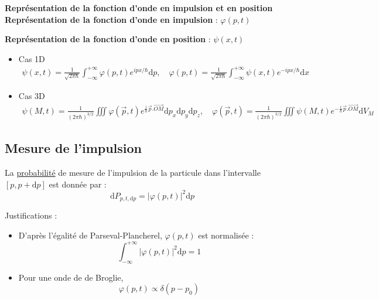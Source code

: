 \begin{Definition}[colbacktitle=red!75!black]{\textbf{Représentation de la fonction d'onde en impulsion et en position}}{}
\textbf{Représentation de la fonction d'onde en impulsion} : $\varphi(p,t)$

\textbf{Représentation de la fonction d'onde en position} : $\psi(x,t)$
\begin{itemize}

    \item Cas 1D
\begin{gather}
  \psi (x, t) = \frac{1}{\sqrt{2 \pi \hbar}}  \int_{ - \infty}^{ + \infty} \varphi(p,t) e ^{ipx / \hbar} \mathrm{d} p, \quad
  \varphi (p, t) = \frac{1}{\sqrt{2 \pi \hbar}}  \int_{ - \infty}^{ + \infty} \psi(x,t) e ^{-ipx / \hbar} \mathrm{d} x
\end{gather}

\item Cas 3D 
  \begin{gather}
    \psi(M,t) = \frac{1}{(2 \pi \hbar) ^{3 / 2}}   \iiint \varphi(\overrightarrow{p},t) e ^{\frac{i}{\hbar} \overrightarrow{p}. \overrightarrow{OM}} \mathrm{d} p_x \mathrm{d} p_y \mathrm{d} p_z, \quad 
    \varphi(\overrightarrow{p},t) = \frac{1}{(2 \pi \hbar) ^{3 / 2}}   \iiint \psi(M,t) e ^{-\frac{i}{\hbar} \overrightarrow{p}. \overrightarrow{OM}} \mathrm{d} V_M
  \end{gather} 

\end{itemize}
\end{Definition}

\subsection{Mesure de l'impulsion} %
\label{sub:Mesure de l'impulsion}

La \underline{probabilité} de mesure de l'impulsion de la particule dans l'intervalle $[p, p + \mathrm{d}p]$ est donnée par : 
\begin{equation}
  \mathrm{d}P _{p, t, \mathrm{d}p} = |\varphi(p, t)| ^{2} \mathrm{d}p
\end{equation}

Justifications : 
\begin{itemize}

    \item D'après l'égalité de Parseval-Plancherel, $\varphi(p,t)$ est normalisée : 
      \begin{equation}
        \int_{- \infty}^{+ \infty} |\varphi(p,t)| ^{2} \mathrm{d} p = 1
      \end{equation}

    \item Pour une onde de de Broglie, 
      \begin{equation}
        \varphi(p,t) \propto \delta(p - p_0)
      \end{equation}

\end{itemize}

